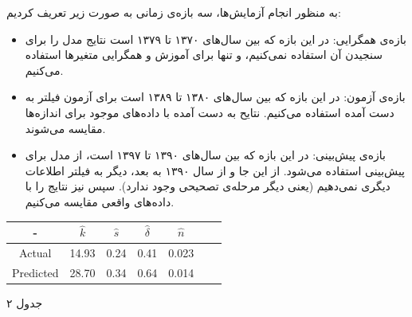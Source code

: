 \documentclass[11pt, fleqn]{article}
\begin{document}
\begin{multicols}{2}
	
	
	
	
	
	
	
	
	
	
	
	
	
	
	
	
	
	
	
	




	
	
	
	
	
	
	


به منظور انجام آزمایش‌ها، سه بازه‌ی زمانی به صورت زیر  تعریف کردیم:


\begin{itemize}
\item
بازه‌ی همگرایی: در این بازه که بین سال‌های ۱۳۷۰ تا ۱۳۷۹ است نتایج مدل را برای سنجیدن آن استفاده نمی‌کنیم، و تنها برای آموزش و همگرایی متغیر‌ها استفاده می‌کنیم.

\item
بازه‌ی آزمون: در این بازه که بین سال‌های ۱۳۸۰ تا ۱۳۸۹ است برای آزمون فیلتر به دست آمده استفاده می‌کنیم. نتایح به دست آمده با داده‌های موجود برای اندازه‌ها مقایسه می‌شوند. 
\item 
بازه‌ی پیش‌بینی: در این بازه که بین سال‌های ۱۳۹۰ تا ۱۳۹۷ است، از مدل برای پیش‌بینی استفاده می‌شود. از این جا و از سال ۱۳۹۰ به بعد، دیگر به فیلتر اطلاعات دیگری نمی‌دهیم (یعنی دیگر مرحله‌ی تصحیحی وجود ندارد).  سپس نیز نتایج را با داده‌های واقعی مقایسه می‌کنیم. 

\end{itemize}



\begin{latin}
\begin{tabular}{|c| c| c| c| c|c|c|} 
\hline 
- & $\hat{k}$ & $\hat{s}$ & $\hat{\delta}$ & $\hat{n}$ \\ [0.5ex]
\hline 
Actual 	  & 14.93 & 0.24 & 0.41 & 0.023 \\ 
Predicted & 28.70 & 0.34 & 0.64 & 0.014 \\
 [1ex] 
\hline 
\end{tabular}
\end{latin} 

\begin{center}
جدول ۲
\end{center}


\end{multicols}
\end{document}
